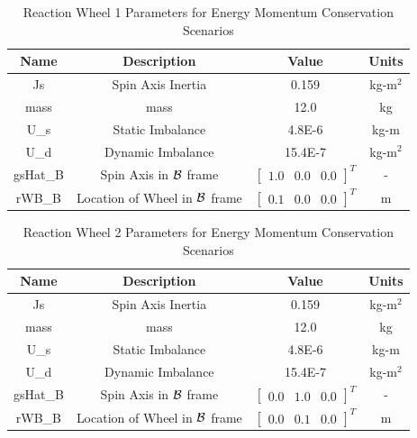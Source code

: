 \begin{table}[htbp]
	\caption{Reaction Wheel 1 Parameters for Energy Momentum Conservation Scenarios}
	\label{tab:rw1}
	\centering \fontsize{10}{10}\selectfont
	\begin{tabular}{ c | c | c | c } %
		\hline
		\textbf{Name}  & \textbf{Description}  & \textbf{Value} & \textbf{Units} \\
		\hline
		Js  & Spin Axis Inertia & 0.159 & kg-m$^2$ \\
		mass & mass & 12.0 & kg \\
		U\_s & Static Imbalance & 4.8E-6 & kg-m \\
		U\_d & Dynamic Imbalance & 15.4E-7 & kg-m$^2$ \\
		gsHat\_B & Spin Axis in $\cal{B}$ frame & $\begin{bmatrix}
		1.0 & 0.0 & 0.0 \end{bmatrix}^T$ & - \\
		rWB\_B & Location of Wheel in $\cal{B}$ frame & $\begin{bmatrix}
		0.1 & 0.0 & 0.0 \end{bmatrix}^T$ & m \\
		\hline
	\end{tabular}
\end{table}

\begin{table}[htbp]
	\caption{Reaction Wheel 2 Parameters for Energy Momentum Conservation Scenarios}
	\label{tab:rw2}
	\centering \fontsize{10}{10}\selectfont
	\begin{tabular}{ c | c | c | c } %
		\hline
		\textbf{Name}  & \textbf{Description}  & \textbf{Value} & \textbf{Units} \\
		\hline
		Js  & Spin Axis Inertia & 0.159 & kg-m$^2$ \\
		mass & mass & 12.0 & kg \\
		U\_s & Static Imbalance & 4.8E-6 & kg-m \\
		U\_d & Dynamic Imbalance & 15.4E-7 & kg-m$^2$ \\
		gsHat\_B & Spin Axis in $\cal{B}$ frame & $\begin{bmatrix}
		0.0 & 1.0 & 0.0 \end{bmatrix}^T$ & - \\
		rWB\_B & Location of Wheel in $\cal{B}$ frame & $\begin{bmatrix}
		0.0 & 0.1 & 0.0 \end{bmatrix}^T$ & m \\
		\hline
	\end{tabular}
\end{table}

